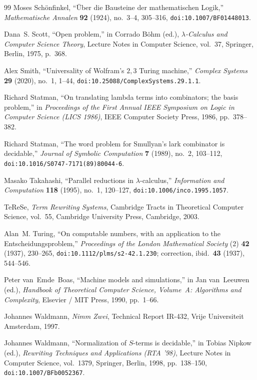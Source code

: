 \documentclass[11pt,reqno]{amsart}
\numberwithin{equation}{section}
\theoremstyle{plain}
\theoremstyle{definition}
\theoremstyle{remark}
\begin{document}
\begin{thebibliography}{99}
Moses Sch{\"o}nfinkel,
``{\"U}ber die Bausteine der mathematischen Logik,''
\emph{Mathematische Annalen} \textbf{92} (1924), no.~3--4, 305--316,
\texttt{doi:10.1007/BF01448013}.

Dana~S. Scott,
``Open problem,''
in Corrado B{\"o}hm (ed.), \emph{$\lambda$-Calculus and Computer Science Theory},
Lecture Notes in Computer Science, vol.~37, Springer, Berlin, 1975, p.~368.

Alex Smith,
``Universality of Wolfram's $2, 3$ Turing machine,''
\emph{Complex Systems} \textbf{29} (2020), no.~1, 1--44,
\texttt{doi:10.25088/ComplexSystems.29.1.1}.

Richard Statman,
``On translating lambda terms into combinators; the basis problem,''
in \emph{Proceedings of the First Annual IEEE Symposium on Logic in Computer Science (LICS 1986)},
IEEE Computer Society Press, 1986, pp.~378--382.

Richard Statman,
``The word problem for Smullyan's lark combinator is decidable,''
\emph{Journal of Symbolic Computation} \textbf{7} (1989), no.~2, 103--112,
\texttt{doi:10.1016/S0747-7171(89)80044-6}.

Masako Takahashi,
``Parallel reductions in $\lambda$-calculus,''
\emph{Information and Computation} \textbf{118} (1995), no.~1, 120--127,
\texttt{doi:10.1006/inco.1995.1057}.

{TeReSe},
\emph{Term Rewriting Systems},
Cambridge Tracts in Theoretical Computer Science, vol.~55,
Cambridge University Press, Cambridge, 2003.

Alan~M. Turing,
``On computable numbers, with an application to the Entscheidungsproblem,''
\emph{Proceedings of the London Mathematical Society} (2) \textbf{42} (1937), 230--265,
\texttt{doi:10.1112/plms/s2-42.1.230}; correction, ibid.\ \textbf{43} (1937), 544--546.

Peter van~Emde~Boas,
``Machine models and simulations,''
in Jan van~Leeuwen (ed.), \emph{Handbook of Theoretical Computer Science, Volume~A: Algorithms and Complexity},
Elsevier / MIT Press, 1990, pp.~1--66.

Johannes Waldmann,
\emph{Nimm Zwei},
Technical Report IR-432, Vrije Universiteit Amsterdam, 1997.

Johannes Waldmann,
``Normalization of $S$-terms is decidable,''
in Tobias Nipkow (ed.), \emph{Rewriting Techniques and Applications (RTA '98)},
Lecture Notes in Computer Science, vol.~1379, Springer, Berlin, 1998, pp.~138--150,
\texttt{doi:10.1007/BFb0052367}.


\end{thebibliography}
\end{document}
